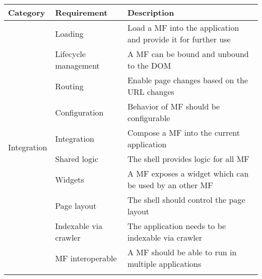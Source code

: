 
\setlength{\tabcolsep}{4.265pt} %
\begin{longtable}{|l|l|p{}|}
	\hline
	\textbf{Category}             & \textbf{Requirement}   & \textbf{Description}                                                                               \\ \hline
	\multirow{12}{*}{Integration} & Loading                & Load a \ac{MF} into the application and provide it for further use                                 \\ \cline{2-3}
	                              & Lifecycle management   & A \ac{MF} can be bound and unbound to the \ac{DOM}                                                 \\ \cline{2-3}
	                              & Routing                & Enable page changes based on the \ac{URL} changes                                                  \\ \cline{2-3}
	                              & Configuration          & Behavior of \ac{MF} should be configurable                                                         \\ \cline{2-3}
	                              & Integration            & Compose a \ac{MF} into the current application                                                     \\ \cline{2-3}
	                              & Shared logic           & The shell provides logic for all \ac{MF}                                                           \\ \cline{2-3}
	                              & Widgets                & A \ac{MF} exposes a widget which can be used by an other \ac{MF}                                   \\ \cline{2-3}
	                              & Page layout            & The shell should control the page layout                                                           \\ \cline{2-3}
	                              & Indexable via crawler  & The application needs to be indexable via crawler                                                  \\ \cline{2-3}
	                              & \ac{MF} interoperable  & A \ac{MF} should be able to run in multiple applications                                           \\ \cline{2-3}

\end{longtable}
